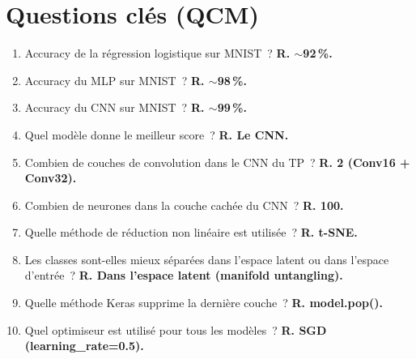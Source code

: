 \documentclass[a4paper,11pt]{article}
\begin{document}
\newpage
\section*{Questions cl\'es (QCM)}

\begin{enumerate}
  \item Accuracy de la r\'egression logistique sur MNIST~?
    \textbf{R. $\sim$92\,\%.}
  \item Accuracy du MLP sur MNIST~? \textbf{R. $\sim$98\,\%.}
  \item Accuracy du CNN sur MNIST~? \textbf{R. $\sim$99\,\%.}
  \item Quel mod\`ele donne le meilleur score~?
    \textbf{R. Le CNN.}
  \item Combien de couches de convolution dans le CNN du TP~?
    \textbf{R. 2 (Conv16 + Conv32).}
  \item Combien de neurones dans la couche cach\'ee du CNN~?
    \textbf{R. 100.}
  \item Quelle m\'ethode de r\'eduction non lin\'eaire est
    utilis\'ee~? \textbf{R. t-SNE.}
  \item Les classes sont-elles mieux s\'epar\'ees dans l'espace
    latent ou dans l'espace d'entr\'ee~?
    \textbf{R. Dans l'espace latent (manifold untangling).}
  \item Quelle m\'ethode Keras supprime la derni\`ere couche~?
    \textbf{R. model.pop().}
  \item Quel optimiseur est utilis\'e pour tous les mod\`eles~?
    \textbf{R. SGD (learning\_rate=0.5).}
\end{enumerate}
\end{document}
